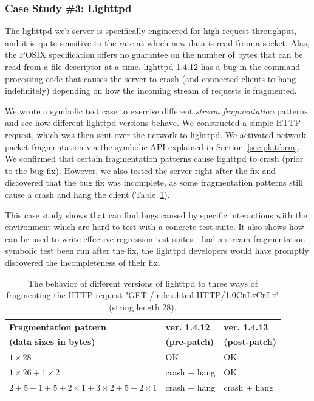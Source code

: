 \subsubsection{Case Study \#3: Lighttpd}
\label{sec:lighttpd}


The lighttpd web server is specifically engineered for high request throughput, and it is quite sensitive to the rate at which new data is read from a socket.  Alas, the POSIX specification offers no guarantee on the number of bytes that can be read from a file descriptor at a time.  lighttpd 1.4.12 has a bug in the command-processing code that causes the server to crash (and connected clients to hang indefinitely) depending on how the incoming stream of requests is fragmented. 

We wrote a symbolic test case to exercise different \emph{stream fragmentation} patterns and see how different lighttpd versions behave. We constructed a simple HTTP request, which was then sent over the network to lighttpd. We activated network packet fragmentation via the symbolic   API explained in Section~\ref{sec:platform}. We confirmed that certain fragmentation patterns cause lighttpd to crash (prior to the bug fix). However, we also tested the server right after the fix and discovered that the bug fix was incomplete, as some fragmentation patterns still cause a crash and hang the client (Table~\ref{table:lighttpd}).

This case study shows that \cnine can find bugs caused by specific interactions with the environment which are hard to test with a concrete test suite. It also shows how \cnine can be used to write effective regression test suites---had a stream-fragmentation symbolic test been run after the fix, the lighttpd developers would have promptly discovered the incompleteness of their fix.

\begin{table}
\small
\centering
\begin{tabular}{| p{3.8cm} | p{1.65cm} | p{1.65cm} |}
\hline
\bf Fragmentation pattern & \bf ver. 1.4.12 & \bf ver. 1.4.13 \\
\bf (data sizes in bytes) & \bf (pre-patch)     & \bf (post-patch)\\
\hline
$1 \times 28$ 			& 		OK		& OK \\
\hline
$1 \times 26 + 1 \times 2$  & crash + hang 	& OK \\
\hline
$2+5+1+5+2 \times 1 + 3 \times 2 + 5 + 2 \times 1 $	& crash + hang 	& crash + hang \\
\hline
\end{tabular}
\caption{The behavior of different versions of lighttpd to three ways of fragmenting the HTTP request "GET /index.html HTTP/1.0\textsc{Cr}\textsc{Lf}\textsc{Cr}\textsc{Lf}" (string length 28).}
\label{table:lighttpd}
\end{table}


